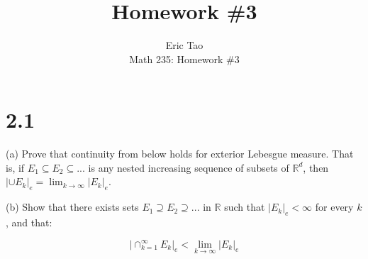 \documentclass[10pt]{article}
\newenvironment{problem}[2][Problem]{\begin{trivlist}
\item[\hskip \labelsep {\bfseries #1}\hskip \labelsep {\bfseries #2.}]}{\end{trivlist}}
\begin{document}
 
\title{Homework \#3}
\author{Eric Tao\\
Math 235: Homework \#3}
\maketitle
 
\section*{2.1}

\begin{problem}{2.4.8}
(a) Prove that continuity from below holds for exterior Lebesgue measure. That is, if $E_1 \subseteq E_2 \subseteq ...$ is any nested increasing sequence of subsets of $\mathbb{R}^d$, then $|\cup E_k|_e = \lim_{k \to \infty} |E_k|_e$.

(b) Show that there exists sets $E_1 \supseteq E_2 \supseteq ...$ in $\mathbb{R}$ such that $|E_k|_e < \infty$ for every $k$, and that:

$$ | \cap_{k=1}^\infty E_k |_e < \lim_{k \rightarrow \infty} |E_k|_e $$
\end{problem}
\end{document}
